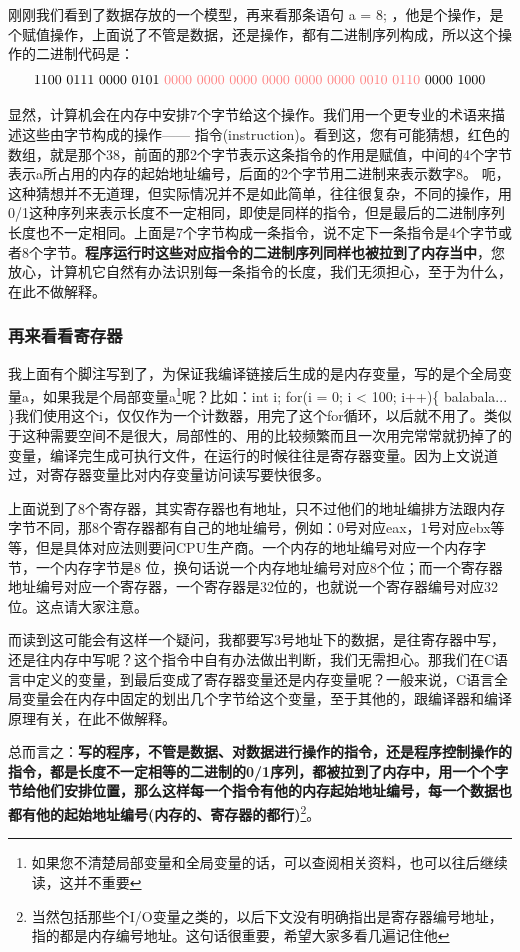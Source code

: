 \documentclass[11pt,twoside,a4paper,titlepage]{article}	%
\newcommand{\kw}[1]{\textcolor[rgb]{0.0,0.0,0.63}{ #1}}
\begin{document}
刚刚我们看到了数据存放的一个模型，再来看那条语句 a = 8; ，他是个操作，是个赋值操作，上面说了不管是数据，还是操作，都有二进制序列构成，所以这个操作的二进制代码是：
$$1100\ 0111\ 0000\ 0101\ \textcolor[rgb]{1.0,0.5,0.5}{0000\ 0000\ 0000\ 0000\ 0000\ 0000\ 0010\ 0110}\ 0000\ 1000$$

显然，计算机会在内存中安排7个字节给这个操作。我们用一个更专业的术语来描述这些由字节构成的操作——\kw{指令(instruction)}。看到这，您有可能猜想，红色的数组，就是那个38，前面的那2个字节表示这条指令的作用是赋值，中间的4个字节表示a所占用的内存的起始地址编号，后面的2个字节用二进制来表示数字8。 呃，这种猜想并不无道理，但实际情况并不是如此简单，往往很复杂，不同的操作，用0/1这种序列来表示长度不一定相同，即使是同样的指令，但是最后的二进制序列长度也不一定相同。上面是7个字节构成一条指令，说不定下一条指令是4个字节或者8个字节。\textbf{程序运行时这些对应指令的二进制序列同样也被拉到了内存当中}，您放心，计算机它自然有办法识别每一条指令的长度，我们无须担心，至于为什么，在此不做解释。

\subsubsection{再来看看寄存器}
我上面有个脚注写到了，为保证我编译链接后生成的是内存变量，写的是个全局变量a，如果我是个局部变量a\footnote{如果您不清楚局部变量和全局变量的话，可以查阅相关资料，也可以往后继续读，这并不重要}呢？比如：int i; for(i = 0; i < 100; i++)\{ balabala... \}我们使用这个i，仅仅作为一个计数器，用完了这个for循环，以后就不用了。类似于这种需要空间不是很大，局部性的、用的比较频繁而且一次用完常常就扔掉了的变量，编译完生成可执行文件，在运行的时候往往是寄存器变量。因为上文说道过，对寄存器变量比对内存变量访问读写要快很多。

上面说到了8个寄存器，其实寄存器也有地址，只不过他们的地址编排方法跟内存字节不同，那8个寄存器都有自己的地址编号，例如：0号对应eax，1号对应ebx等等，但是具体对应法则要问CPU生产商。一个内存的地址编号对应一个内存字节，一个内存字节是8 位，换句话说一个内存地址编号对应8个位；而一个寄存器地址编号对应一个寄存器，一个寄存器是32位的，也就说一个寄存器编号对应32位。这点请大家注意。

而读到这可能会有这样一个疑问，我都要写3号地址下的数据，是往寄存器中写，还是往内存中写呢？这个指令中自有办法做出判断，我们无需担心。那我们在C语言中定义的变量，到最后变成了寄存器变量还是内存变量呢？一般来说，C语言全局变量会在内存中固定的划出几个字节给这个变量，至于其他的，跟编译器和编译原理有关，在此不做解释。

总而言之：\textbf{写的程序，不管是数据、对数据进行操作的指令，还是程序控制操作的指令，都是长度不一定相等的二进制的0/1序列，都被拉到了内存中，用一个个字节给他们安排位置，那么这样每一个指令有他的内存起始地址编号，每一个数据也都有他的起始地址编号(内存的、寄存器的都行)}\footnote{当然包括那些个I/O变量之类的，以后下文没有明确指出是寄存器编号地址，指的都是内存编号地址。这句话很重要，希望大家多看几遍记住他}。
\end{document}
